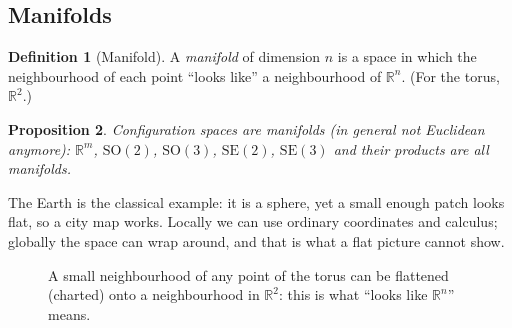 \documentclass[11pt,a4paper]{article}
\newcommand{\R}{\mathbb{R}}
\newcommand{\SO}{\mathrm{SO}}
\newcommand{\SE}{\mathrm{SE}}
\theoremstyle{definition}
\newtheorem{definition}{Definition}[section]
\theoremstyle{plain}
\newtheorem{proposition}[definition]{Proposition}
\theoremstyle{remark}
\begin{document}
\subsection{Manifolds}

\begin{definition}[Manifold]
A \emph{manifold} of dimension $n$ is a space in which the neighbourhood of each point ``looks like'' a neighbourhood of $\R^n$. (For the torus, $\R^2$.)
\end{definition}

\begin{proposition}
Configuration spaces are manifolds (in general \emph{not} Euclidean anymore): $\R^m$, $\SO(2)$, $\SO(3)$, $\SE(2)$, $\SE(3)$ and their products are all manifolds.
\end{proposition}

\begin{intuition}
The Earth is the classical example: it is a sphere, yet a small enough patch looks flat, so a city map works. Locally we can use ordinary coordinates and calculus; globally the space can wrap around, and that is what a flat picture cannot show.
\end{intuition}

\begin{figure}[ht]
\centering
{}
\caption{A small neighbourhood of any point of the torus can be flattened (charted) onto a neighbourhood in $\R^2$: this is what ``looks like $\R^n$'' means.}
\end{figure}
\end{document}
